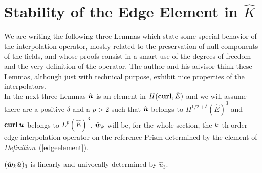 \section{Stability of the Edge Element in $\hat{K}$}
\label{}
We are writing the following three Lemmas which state some special
behavior of the interpolation operator, mostly related to the preservation of
null components of the fields, and whose proofs consist in a smart use of the
degrees of freedom and the very definition of the operator. The author and his
advisor think these Lemmas, although just with technical purpose, exhibit
nice properties of the interpolators.\\
\noindent In the next three Lemmas $\hat{\boldsymbol{u}}$ is an element
in $H({\bf curl},\hat{E})$ and we will assume there are 
a positive $\delta$ and a $p>2$ such that 
$\hat{\boldsymbol{u}}$ belongs to $H^{1/2+\delta}(\hat{E})^3$ and
${\bf curl}\,\boldsymbol{u}$ belongs to $L^p(\hat{E})^3$.
$\hat{\boldsymbol{w}}_k$ will be, for the whole section, the $k$--th order edge 
interpolation operator on the reference
Prism determined by the element of
\emph{Definition}~(\ref{edgeelement}).
\begin{lemma}\label{lema_PIu3_k_cualquiera} 
$(\hat{\boldsymbol{w}}_k\hat{\boldsymbol{u}})_3$ is linearly and univocally 
determined by $\hat{u}_3$.
\end{lemma}
